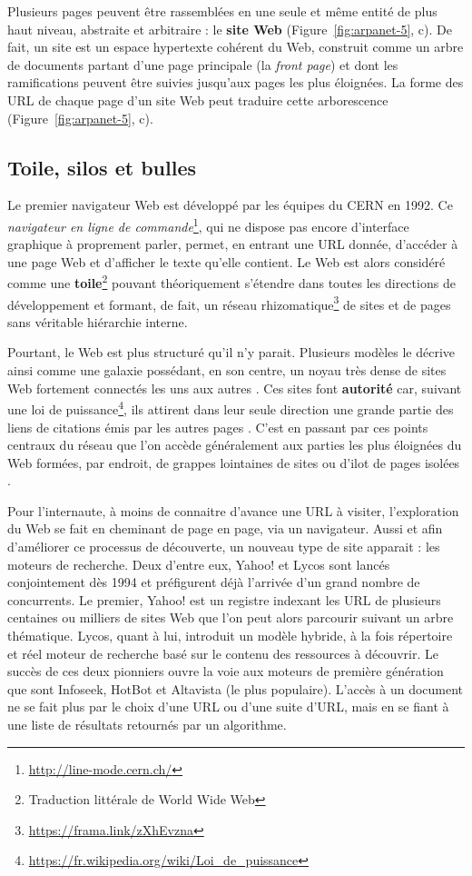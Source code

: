 \documentclass[symmetric,justified,marginals=raggedouter]{tufte-book}
\begin{document}
Plusieurs pages peuvent être rassemblées en une seule et même entité de plus haut niveau, abstraite et arbitraire : le \textbf{site Web} (Figure~\ref{fig:arpanet-5}, c). De fait, un site est un espace hypertexte cohérent du Web, construit comme un arbre de documents partant d'une page principale (la \textit{front page}) et dont les ramifications peuvent être suivies jusqu'aux pages les plus éloignées. La forme des URL de chaque page d'un site Web peut traduire cette arborescence (Figure~\ref{fig:arpanet-5}, c).  

\subsection{Toile, silos et bulles} 

\noindent Le premier navigateur Web est développé par les équipes du CERN en 1992. Ce \textit{navigateur en ligne de commande}\footnote{\RaggedOuter \url{http://line-mode.cern.ch/}}, qui ne dispose pas encore d'interface graphique à proprement parler, permet, en entrant une URL donnée, d'accéder à une page Web et d'afficher le texte qu'elle contient. Le Web est alors considéré comme une \textbf{toile}\footnote{\RaggedOuter Traduction littérale de World Wide Web} pouvant théoriquement s'étendre dans toutes les directions de développement et formant, de fait, un réseau rhizomatique\footnote{\RaggedOuter \url{https://frama.link/zXhEvzna}} de sites et de pages sans véritable hiérarchie interne. 

Pourtant, le Web est plus structuré qu'il n'y parait. Plusieurs modèles le décrive ainsi comme une galaxie possédant, en son centre, un noyau très dense de sites Web fortement connectés les uns aux autres \citep{broder_graph_2000}. Ces sites font \textbf{autorité} car, suivant une loi de puissance\footnote{\RaggedOuter \url{https://fr.wikipedia.org/wiki/Loi\_de\_puissance}}, ils attirent dans leur seule direction une grande partie des liens de citations émis par les autres pages \citep{barabasi_scale-free_2000}. C'est en passant par ces points centraux du réseau que l'on accède généralement aux parties les plus éloignées du Web formées, par endroit, de grappes lointaines de sites ou d'ilot de pages isolées \citep{kumar_stochastic_2000}.

Pour l'internaute, à moins de connaitre d'avance une URL à visiter, l'exploration du Web se fait en cheminant de page en page, via un navigateur. Aussi et afin d'améliorer ce processus de découverte, un nouveau type de site apparait : les moteurs de recherche. Deux d'entre eux, Yahoo! et Lycos sont lancés conjointement dès 1994 et préfigurent déjà l'arrivée d'un grand nombre de concurrents. Le premier, Yahoo! est un registre indexant les URL de plusieurs centaines ou milliers de sites Web que l'on peut alors parcourir suivant un arbre thématique. Lycos, quant à lui, introduit un modèle hybride, à la fois répertoire et réel moteur de recherche basé sur le contenu des ressources à découvrir. Le succès de ces deux pionniers ouvre la voie aux moteurs de première génération que sont Infoseek, HotBot et Altavista (le plus populaire). L'accès à un document ne se fait plus par le choix d'une URL ou d'une suite d'URL, mais en se fiant à une liste de résultats retournés par un algorithme.
\end{document}
